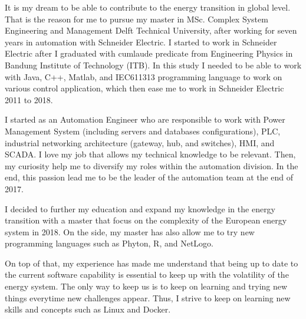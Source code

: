 \documentclass[11pt, a4paper]{awesome-cv}
\begin{document}
\makecvheader[R]


\makelettertitle

\begin{cvletter}
It is my dream to be able to contribute to the energy transition in global level. That is the reason for me to pursue my master in MSc. Complex System Engineering and Management Delft Technical University, after working for seven years in automation with Schneider Electric. I started to work in Schneider Electric after I graduated with cumlaude predicate from Engineering Physics in Bandung Institute of Technology (ITB). In this study I needed to be able to work with Java, C++, Matlab, and IEC611313 programming language to work on various control application, which then ease me to work in Schneider Electric 2011 to 2018. 

I started as an Automation Engineer who are responsible to work with Power Management System (including servers and databases configurations), PLC, industrial networking architecture (gateway, hub, and switches), HMI, and SCADA. I love my job that allows my technical knowledge to be relevant. Then, my curiosity help me to diversify my roles within the automation division. In the end, this passion lead me to be the leader of the automation team at the end of 2017. 

I decided to further my education and expand my knowledge in the energy transition with a master that focus on the complexity of the European energy system in 2018. On the side, my master has also allow me to try new programming languages such as Phyton, R, and NetLogo.

On top of that, my experience has made me understand that being up to date to the current software capability is essential to keep up with the volatility of the energy system. The only way to keep us is to keep on learning and trying new things everytime new challenges appear. Thus, I strive to keep on learning new skills and concepts such as Linux and Docker. 


\end{cvletter}
\end{document}
